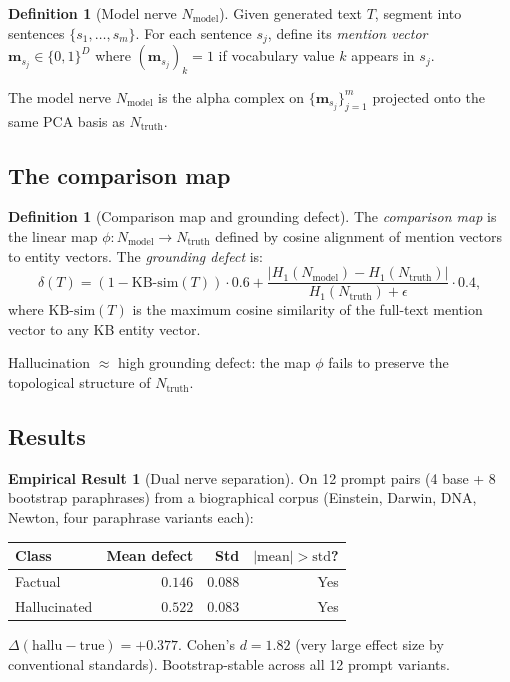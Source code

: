 \documentclass[11pt]{amsart}
\theoremstyle{definition}
\newtheorem{definition}[theorem]{Definition}
\newtheorem{empiricalresult}[theorem]{Empirical Result}
\newcommand{\Nmod}{N_{\mathrm{model}}}
\newcommand{\Ntruth}{N_{\mathrm{truth}}}
\begin{document}
\begin{definition}[Model nerve $\Nmod$]
Given generated text $T$, segment into sentences $\{s_1, \ldots, s_m\}$.
For each sentence $s_j$, define its \emph{mention vector} $\mathbf{m}_{s_j} \in \{0,1\}^D$
where $(\mathbf{m}_{s_j})_k = 1$ if vocabulary value $k$ appears in $s_j$.

The model nerve $\Nmod$ is the alpha complex on $\{\mathbf{m}_{s_j}\}_{j=1}^m$
projected onto the same PCA basis as $\Ntruth$.
\end{definition}

\subsection{The comparison map}

\begin{definition}[Comparison map and grounding defect]
\label{def:grounding-defect}
The \emph{comparison map} is the linear map
$\phi: \Nmod \to \Ntruth$ defined by cosine alignment of mention vectors
to entity vectors.
The \emph{grounding defect} is:
\[
  \delta(T) = (1 - \mathrm{KB\text{-}sim}(T)) \cdot 0.6
            + \frac{|H_1(\Nmod) - H_1(\Ntruth)|}{H_1(\Ntruth) + \epsilon} \cdot 0.4,
\]
where $\mathrm{KB\text{-}sim}(T)$ is the maximum cosine similarity of the
full-text mention vector to any KB entity vector.

Hallucination $\approx$ high grounding defect: the map $\phi$ fails to
preserve the topological structure of $\Ntruth$.
\end{definition}

\subsection{Results}

\begin{empiricalresult}[Dual nerve separation]
\label{result:dual-nerve}
On 12 prompt pairs (4 base + 8 bootstrap paraphrases) from a biographical corpus
(Einstein, Darwin, DNA, Newton, four paraphrase variants each):
\begin{center}
\begin{tabular}{lrrr}
\toprule
Class & Mean defect & Std & $|\mathrm{mean}| > \mathrm{std}$? \\
\midrule
Factual & $0.146$ & $0.088$ & Yes \\
Hallucinated & $0.522$ & $0.083$ & Yes \\
\bottomrule
\end{tabular}
\end{center}
$\Delta(\mathrm{hallu} - \mathrm{true}) = +0.377$.
Cohen's $d = 1.82$ (very large effect size by conventional standards).
Bootstrap-stable across all 12 prompt variants.
\end{empiricalresult}
\end{document}

